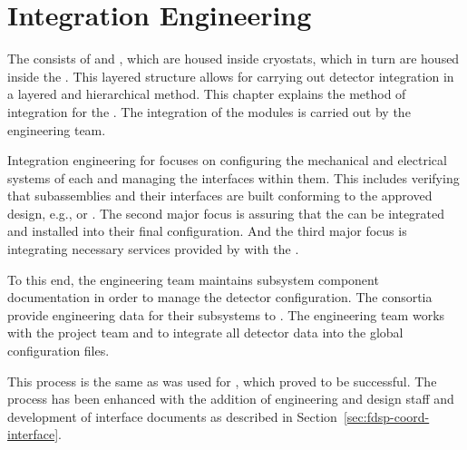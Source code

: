 \chapter{Integration Engineering}
\label{sec:fdsp-coord-integ-sysengr}


The   %
consists of %
 and , 
which are housed inside cryostats, which in turn are housed
inside the  .
 This layered structure allows for carrying out
detector integration in a layered and hierarchical method. %
This chapter explains the method of integration for the .
 The integration of the modules is carried out by the
 engineering team.

Integration engineering for  focuses on configuring the
mechanical and electrical systems of each  and managing
the interfaces within them. This includes verifying that subassemblies
and their interfaces are built conforming to the approved design,
e.g.,  or  . The second major focus
is assuring that the  can be integrated and
installed into their final configuration. And the third major focus is
integrating necessary services provided by  
with the .


To this end, the  engineering team maintains subsystem
component documentation in order to manage the detector
configuration. The consortia provide engineering data for their
subsystems to . The  engineering team works with
the  project team and  to integrate all detector
data into the global  configuration files.

This process is the same as was used for , which proved to be
successful. The process has been enhanced with the addition of engineering
and design staff and development of interface documents as described
in Section~\ref{sec:fdsp-coord-interface}. %

